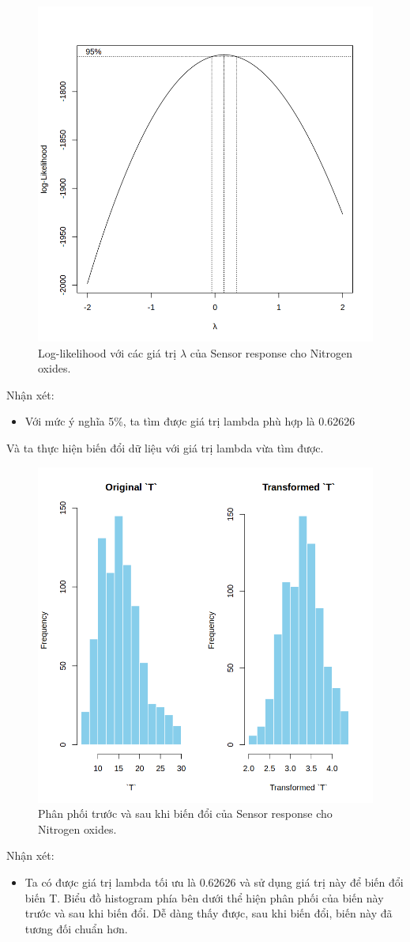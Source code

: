 \begin{figure}[H]
    \centering
    \includegraphics[width=0.75\columnwidth]{air_figures/T_optimal_lambda.png}
    \caption{Log-likelihood với các giá trị $\lambda$ của Sensor response cho Nitrogen oxides.}
    \label{fig:t_optimal_lambda}
\end{figure}
Nhận xét:
\begin{itemize}
    \item Với mức ý nghĩa 5\%, ta tìm được giá trị lambda phù hợp là 0.62626
\end{itemize}

Và ta thực hiện biến đổi dữ liệu với giá trị lambda vừa tìm được.
\begin{figure}[H]
    \centering
    \includegraphics[width=0.75\columnwidth]{air_figures/T_transformed_distribution.png}
    \caption{Phân phối trước và sau khi biến đổi của Sensor response cho Nitrogen oxides.}
    \label{fig:t_transformed_distribution}
\end{figure}
Nhận xét:
\begin{itemize}
    \item Ta có được giá trị lambda tối ưu là 0.62626 và sử dụng giá trị này để biến đổi biến T. Biểu đồ histogram phía bên dưới thể hiện phân phối của biến này trước và sau khi biến đổi. Dễ dàng thấy được, sau khi biến đổi, biến này đã tương đối chuẩn hơn.
\end{itemize}

